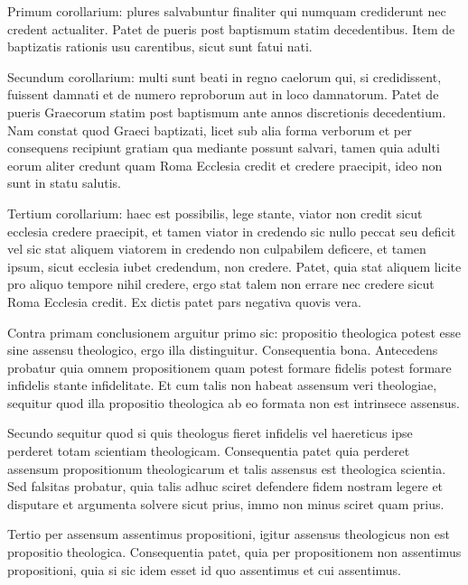 \documentclass[twoside, openright]{article}
\begin{document}
        \pstart
        Primum corollarium: plures salvabuntur finaliter qui numquam crediderunt nec credent actualiter. Patet de pueris post baptismum statim decedentibus. Item de baptizatis rationis usu carentibus, sicut sunt fatui nati.
        \pend
     
        \pstart
        Secundum corollarium: multi sunt beati in regno caelorum qui, si credidissent, fuissent damnati et de numero reproborum aut in loco damnatorum. Patet de pueris Graecorum statim  post baptismum ante annos discretionis decedentium. Nam constat quod Graeci baptizati, licet sub alia forma verborum et per consequens recipiunt gratiam qua mediante possunt salvari, tamen quia adulti eorum aliter credunt quam Roma Ecclesia credit et credere praecipit, ideo non sunt in statu salutis.
        \pend
     
        \pstart
        Tertium corollarium: haec est possibilis, lege stante, viator non credit sicut ecclesia credere praecipit, et tamen viator in credendo sic nullo peccat seu deficit vel sic stat aliquem viatorem in credendo non culpabilem deficere, et tamen ipsum, sicut ecclesia iubet credendum, non credere. Patet, quia stat aliquem licite pro aliquo tempore nihil credere, ergo stat talem non errare nec credere sicut Roma Ecclesia credit. Ex dictis patet pars negativa quovis vera.
        \pend
     
        \pstart
        Contra primam conclusionem arguitur primo sic: propositio theologica potest esse sine assensu theologico, ergo illa distinguitur. Consequentia bona. Antecedens probatur quia omnem propositionem quam potest formare fidelis potest formare infidelis stante infidelitate. Et cum talis non habeat assensum veri theologiae, sequitur quod illa propositio theologica ab eo formata non est intrinsece assensus.
        \pend
     
        \pstart
        Secundo sequitur quod si quis theologus fieret infidelis vel haereticus ipse perderet totam scientiam theologicam. Consequentia patet quia perderet assensum propositionum theologicarum et talis assensus est theologica scientia. Sed falsitas probatur, quia talis adhuc sciret defendere fidem nostram legere et disputare et argumenta solvere sicut prius, immo non minus sciret quam prius.
        \pend
     
        \pstart
        Tertio per assensum assentimus propositioni, igitur assensus theologicus non est propositio theologica. Consequentia patet, quia per propositionem non assentimus propositioni, quia si sic idem esset id quo assentimus et cui assentimus.
        \pend
     
\end{document}
